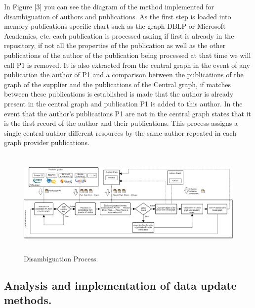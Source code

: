 \documentclass[11pt]{article}
\begin{document}
In Figure [3] you can see the diagram of the method implemented for disambiguation of authors and publications. As the first step is loaded into memory publications specific chart such as the graph DBLP or Microsoft Academics, etc. each publication is processed asking if first is already in the repository, if not all the properties of the publication as well as the other publications of the author of the publication being processed at that time we will call P1 is removed. It is also extracted from the central graph in the event of any publication the author of P1 and a comparison between the publications of the graph of the supplier and the publications of the Central graph, if matches between these publications is established is made that the author is already present in the central graph and publication P1 is added to this author. In the event that the author's publications P1 are not in the central graph states that it is the first record of the author and their publications. This process assigns a single central author different resources by the same author repeated in each graph provider publications.



\begin{figure}[ht!]
	\centering
		\includegraphics[height=5.2cm]{desambiguationProcess.png}
	\caption{Disambiguation Process.}
	\label{fig:Escudo2}
\end{figure}

\subsection{Analysis and implementation of data update methods.}
\end{document}
